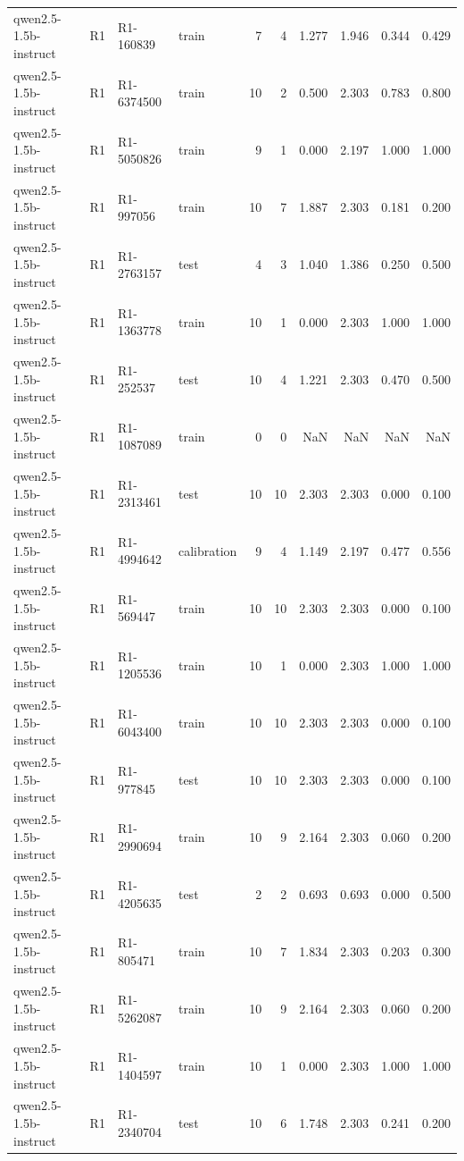 \begin{table}
\begin{tabular}{llllrrrrrr}
qwen2.5-1.5b-instruct & R1 & R1-160839 & train & 7 & 4 & 1.277 & 1.946 & 0.344 & 0.429 \\
qwen2.5-1.5b-instruct & R1 & R1-6374500 & train & 10 & 2 & 0.500 & 2.303 & 0.783 & 0.800 \\
qwen2.5-1.5b-instruct & R1 & R1-5050826 & train & 9 & 1 & 0.000 & 2.197 & 1.000 & 1.000 \\
qwen2.5-1.5b-instruct & R1 & R1-997056 & train & 10 & 7 & 1.887 & 2.303 & 0.181 & 0.200 \\
qwen2.5-1.5b-instruct & R1 & R1-2763157 & test & 4 & 3 & 1.040 & 1.386 & 0.250 & 0.500 \\
qwen2.5-1.5b-instruct & R1 & R1-1363778 & train & 10 & 1 & 0.000 & 2.303 & 1.000 & 1.000 \\
qwen2.5-1.5b-instruct & R1 & R1-252537 & test & 10 & 4 & 1.221 & 2.303 & 0.470 & 0.500 \\
qwen2.5-1.5b-instruct & R1 & R1-1087089 & train & 0 & 0 & NaN & NaN & NaN & NaN \\
qwen2.5-1.5b-instruct & R1 & R1-2313461 & test & 10 & 10 & 2.303 & 2.303 & 0.000 & 0.100 \\
qwen2.5-1.5b-instruct & R1 & R1-4994642 & calibration & 9 & 4 & 1.149 & 2.197 & 0.477 & 0.556 \\
qwen2.5-1.5b-instruct & R1 & R1-569447 & train & 10 & 10 & 2.303 & 2.303 & 0.000 & 0.100 \\
qwen2.5-1.5b-instruct & R1 & R1-1205536 & train & 10 & 1 & 0.000 & 2.303 & 1.000 & 1.000 \\
qwen2.5-1.5b-instruct & R1 & R1-6043400 & train & 10 & 10 & 2.303 & 2.303 & 0.000 & 0.100 \\
qwen2.5-1.5b-instruct & R1 & R1-977845 & test & 10 & 10 & 2.303 & 2.303 & 0.000 & 0.100 \\
qwen2.5-1.5b-instruct & R1 & R1-2990694 & train & 10 & 9 & 2.164 & 2.303 & 0.060 & 0.200 \\
qwen2.5-1.5b-instruct & R1 & R1-4205635 & test & 2 & 2 & 0.693 & 0.693 & 0.000 & 0.500 \\
qwen2.5-1.5b-instruct & R1 & R1-805471 & train & 10 & 7 & 1.834 & 2.303 & 0.203 & 0.300 \\
qwen2.5-1.5b-instruct & R1 & R1-5262087 & train & 10 & 9 & 2.164 & 2.303 & 0.060 & 0.200 \\
qwen2.5-1.5b-instruct & R1 & R1-1404597 & train & 10 & 1 & 0.000 & 2.303 & 1.000 & 1.000 \\
qwen2.5-1.5b-instruct & R1 & R1-2340704 & test & 10 & 6 & 1.748 & 2.303 & 0.241 & 0.200 \\

\end{tabular}
\end{table}

